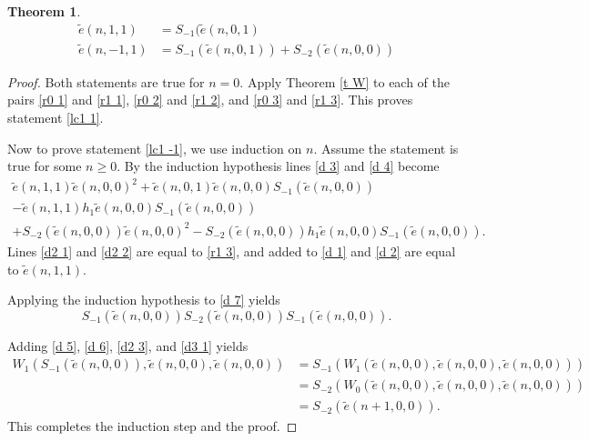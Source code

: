 \documentclass[11pt, oneside]{article}   	%
\newtheorem{theorem}{Theorem}
\newcommand{\te}{\tilde{e}}
\begin{document}
 \begin{theorem} \label{t lc1 s}
\begin{align}
\te(n,1,1) &= S_{-1}(\te(n,0,1) \label{lc1 1}\\
\te(n,-1,1) &= S_{-1}(\te(n,0,1))+ S_{-2}(\te(n,0,0)) \label{lc1 -1}
\end{align}
 \end{theorem}
\begin{proof} 
Both statements are true for $n=0$. Apply Theorem \ref{t W} to each of the pairs \eqref{r0 1} and \eqref{r1 1},  \eqref{r0 2} and \eqref{r1 2}, and  \eqref{r0 3} and \eqref{r1 3}. This proves statement \eqref{lc1 1}.  

Now to prove statement \eqref{lc1 -1}, we use induction on $n$. Assume the statement is true for some $n \geq 0$. By the induction hypothesis lines \eqref{d 3} and \eqref{d 4} become
\begin{align}
\te(n,1,1)\te(n,0,0)^2+\te(n,0,1)\te(n,0,0)S_{-1}(\te(n,0,0)) \label{d2 1}\\ 
 -\te(n,1,1) h_1 \te(n,0,0)S_{-1}(\te(n,0,0)) \label{d2 2} \\ 
 + S_{-2}(\te(n,0,0))\te(n,0,0)^2 -S_{-2}(\te(n,0,0))h_1 \te(n,0,0)S_{-1}(\te(n,0,0)) \label{d2 3}.
\end{align}
Lines \eqref{d2 1} and \eqref{d2 2} are equal to \eqref{r1 3}, and added to \eqref{d 1} and \eqref{d 2} are equal to $\te(n,1,1)$. 

Applying the induction hypothesis to \eqref{d 7} yields 
\begin{equation}
 S_{-1}(\te(n,0,0))  S_{-2}(\te(n,0,0))  S_{-1}(\te(n,0,0)).  \label{d3 1} 
\end{equation}

Adding \eqref{d 5}, \eqref{d 6}, \eqref{d2 3}, and \eqref{d3 1} yields 
\begin{align*}
W_1(S_{-1}(\te(n,0,0)),\te(n,0,0),\te(n,0,0))  &= S_{-1}(W_1(\te(n,0,0),\te(n,0,0),\te(n,0,0)))\\ 
&= S_{-2}(W_0(\te(n,0,0),\te(n,0,0),\te(n,0,0)))\\ 
&= S_{-2}(\te(n+1,0,0)).
\end{align*}
This completes the induction step and the proof. 
\end{proof}
\end{document}
